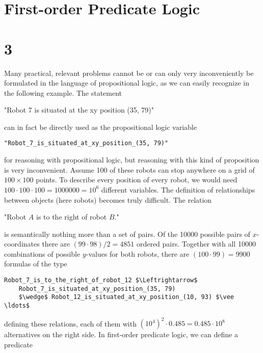 \documentclass[10pt]{article}
\begin{document}
\section*{First-order Predicate Logic}
\section*{3}
Many practical, relevant problems cannot be or can only very inconveniently be formulated in the language of propositional logic, as we can easily recognize in the following example. The statement

\begin{displayquote}
"Robot 7 is situated at the xy position (35, 79)"
\end{displayquote}

can in fact be directly used as the propositional logic variable

\begin{verbatim}
"Robot_7_is_situated_at_xy_position_(35, 79)"
\end{verbatim}

for reasoning with propositional logic, but reasoning with this kind of proposition is very inconvenient. Assume 100 of these robots can stop anywhere on a grid of $100 \times 100$ points. To describe every position of every robot, we would need $100 \cdot 100 \cdot 100=1000000=10^{6}$ different variables. The definition of relationships between objects (here robots) becomes truly difficult. The relation

\begin{displayquote}
"Robot $A$ is to the right of robot $B$."
\end{displayquote}

is semantically nothing more than a set of pairs. Of the 10000 possible pairs of $x$-coordinates there are $(99 \cdot 98) / 2=4851$ ordered pairs. Together with all 10000 combinations of possible $y$-values for both robots, there are $(100 \cdot 99)=9900$ formulas of the type

\begin{verbatim}
Robot_7_is_to_the_right_of_robot_12 $\Leftrightarrow$
    Robot_7_is_situated_at_xy_position_(35, 79)
    $\wedge$ Robot_12_is_situated_at_xy_position_(10, 93) $\vee \ldots$
\end{verbatim}

defining these relations, each of them with $\left(10^{4}\right)^{2} \cdot 0.485=0.485 \cdot 10^{8}$ alternatives on the right side. In first-order predicate logic, we can define a predicate
\end{document}
